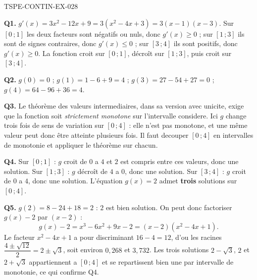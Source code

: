 \begin{corrige}{TSPE-CONTIN-EX-028}

\textbf{Q1.} $g'(x) = 3x^2 - 12x + 9 = 3(x^2 - 4x + 3) = 3(x-1)(x-3)$. Sur $[0\,;1]$ les deux facteurs sont négatifs ou nuls, donc $g'(x) \geq 0$ ; sur $[1\,;3]$ ils sont de signes contraires, donc $g'(x) \leq 0$ ; sur $[3\,;4]$ ils sont positifs, donc $g'(x) \geq 0$. La fonction croit sur $[0\,;1]$, décroît sur $[1\,;3]$, puis croit sur $[3\,;4]$.

\textbf{Q2.} $g(0) = 0$ ; $g(1) = 1 - 6 + 9 = 4$ ; $g(3) = 27 - 54 + 27 = 0$ ; $g(4) = 64 - 96 + 36 = 4$.

\textbf{Q3.} Le théorème des valeurs intermediaires, dans sa version avec unicite, exige que la fonction soit \emph{strictement monotone} sur l'intervalle considere. Ici $g$ change trois fois de sens de variation sur $[0\,;4]$ : elle n'est pas monotone, et une même valeur peut donc être atteinte plusieurs fois. Il faut decouper $[0\,;4]$ en intervalles de monotonie et appliquer le théorème sur chacun.

\textbf{Q4.} Sur $[0\,;1]$ : $g$ croit de $0$ a $4$ et $2$ est compris entre ces valeurs, donc une solution. Sur $[1\,;3]$ : $g$ décroît de $4$ a $0$, donc une solution. Sur $[3\,;4]$ : $g$ croit de $0$ a $4$, donc une solution. L'équation $g(x) = 2$ admet \textbf{trois} solutions sur $[0\,;4]$.

\textbf{Q5.} $g(2) = 8 - 24 + 18 = 2$ : $2$ est bien solution. On peut donc factoriser $g(x) - 2$ par $(x-2)$ :
\[ g(x) - 2 = x^3 - 6x^2 + 9x - 2 = (x-2)\left(x^2 - 4x + 1\right). \]
Le facteur $x^2 - 4x + 1$ a pour discriminant $16 - 4 = 12$, d'ou les racines $\dfrac{4 \pm \sqrt{12}}{2} = 2 \pm \sqrt{3}$, soit environ $0{,}268$ et $3{,}732$. Les trois solutions $2-\sqrt{3}$, $2$ et $2+\sqrt{3}$ appartiennent a $[0\,;4]$ et se repartissent bien une par intervalle de monotonie, ce qui confirme Q4.
\end{corrige}
